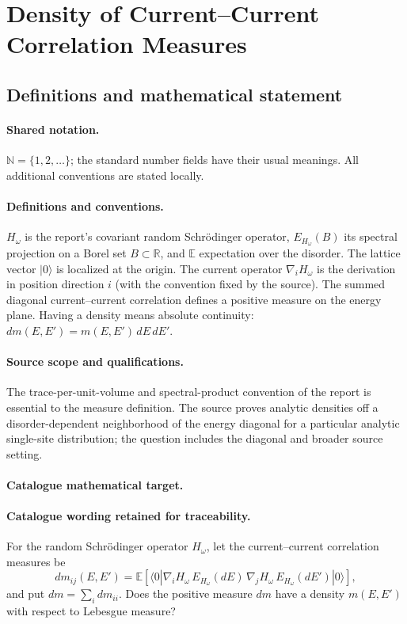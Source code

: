 \documentclass[11pt]{article}
\begin{document}
\section{Density of Current–Current Correlation Measures}\label{statement}

\subsection{Definitions and mathematical statement}

\paragraph{Shared notation.}$\mathbb N=\{1,2,\ldots\}$; the standard number fields have their usual meanings. All additional conventions are stated locally.


\paragraph{Definitions and conventions.} $H_\omega$ is the report's covariant random Schrödinger operator, $E_{H_\omega}(B)$ its spectral projection on a Borel set $B\subset\mathbb R$, and $\mathbb E$ expectation over the disorder. The lattice vector $|0\rangle$ is localized at the origin. The current operator $\nabla_iH_\omega$ is the derivation in position direction $i$ (with the convention fixed by the source). The summed diagonal current--current correlation defines a positive measure on the energy plane. Having a density means absolute continuity: $dm(E,E')=m(E,E')\,dE\,dE'$.

\paragraph{Source scope and qualifications.} The trace-per-unit-volume and spectral-product convention of the report is essential to the measure definition. The source proves analytic densities off a disorder-dependent neighborhood of the energy diagonal for a particular analytic single-site distribution; the question includes the diagonal and broader source setting.

\paragraph{Catalogue mathematical target.}
\paragraph{Catalogue wording retained for traceability.}
For the random Schrödinger operator $H_\omega$, let the current–current correlation measures be $$dm_{ij}(E,E')=\mathbb E\!\left[\langle0|\nabla_iH_\omega\,E_{H_\omega}(dE)\,\nabla_jH_\omega\,E_{H_\omega}(dE')|0\rangle\right],$$ and put $dm=\sum_i dm_{ii}$. Does the positive measure $dm$ have a density $m(E,E')$ with respect to Lebesgue measure?
\end{document}
